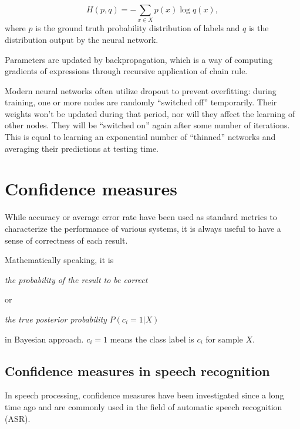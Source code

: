 \documentclass[11pt,a4paper]{report}
\begin{document}
\begin{equation}
  H(p, q) = - \sum_{x \in X} p(x) \log q(x),
\end{equation}
where \(p\) is the ground truth probability distribution of labels and \(q\) is the distribution output by the neural network.

\bigskip

Parameters are updated by backpropagation, which is a way of computing gradients of expressions through recursive application of chain rule.

Modern neural networks often utilize dropout \parencite{srivastava2014dropout} to prevent overfitting: during training, one or more nodes are randomly \enquote{switched off} temporarily.
Their weights won't be updated during that period, nor will they affect the learning of other nodes.
They will be \enquote{switched on} again after some number of iterations.
This is equal to learning an exponential number of \enquote{thinned} networks and averaging their predictions at testing time.

\section{Confidence measures}

While accuracy or average error rate have been used as standard metrics to characterize the performance of various systems, it is always useful to have a sense of correctness of each result.

\bigskip

Mathematically speaking, it is

\begin{center}
  \textit{the probability of the result to be correct}
\end{center}

or

\begin{center}
  \textit{the true posterior probability} \(P (c_i = 1 | X)\)
\end{center}

in Bayesian approach.
\(c_i = 1\) means the class label is \(c_i\) for sample \(X\).

\subsection{Confidence measures in speech recognition}

In speech processing, confidence measures have been investigated since a long time ago and are commonly used in the field of automatic speech recognition (ASR).
\end{document}
